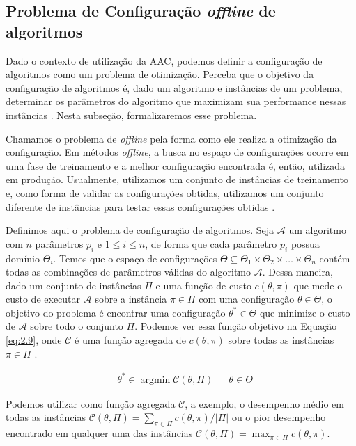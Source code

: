 \subsection{Problema de Configuração \textit{offline} de algoritmos}

Dado o contexto de utilização da \ac{AAC}, podemos definir a configuração de algoritmos como um problema de otimização. Perceba que o objetivo da configuração de algoritmos é, dado um algoritmo e instâncias de um problema, determinar os parâmetros do algoritmo que maximizam sua performance nessas instâncias \citep{birattari2009tuning}. Nesta subseção, formalizaremos esse problema.

Chamamos o problema de \textit{offline} pela forma como ele realiza a otimização da configuração. Em métodos \textit{offline}, a busca no espaço de configurações ocorre em uma fase de treinamento e a melhor configuração encontrada é, então, utilizada em produção. Usualmente, utilizamos um conjunto de instâncias de treinamento e, como forma de validar as configurações obtidas, utilizamos um conjunto diferente de instâncias para testar essas configurações obtidas \citep{birattari2009tuning}.

Definimos aqui o problema de configuração de algoritmos. Seja $\mathcal{A}$ um algoritmo com $n$ parâmetros $p_i$ e $1 \leq i \leq n$, de forma que cada parâmetro $p_i$ possua domínio $\Theta_i$. Temos que o espaço de configurações $\Theta \subseteq \Theta_1 \times \Theta_2 \times \ldots \times \Theta_n$ contém todas as combinações de parâmetros válidas do algoritmo $\mathcal{A}$. Dessa maneira, dado um conjunto de instâncias $\Pi$ e uma função de custo $c(\theta, \pi)$ que mede o custo de executar $\mathcal{A}$ sobre a instância $\pi \in \Pi$ com uma configuração $\theta \in \Theta$, o objetivo do problema é encontrar uma configuração $\theta^* \in \Theta$ que minimize o custo de $\mathcal{A}$ sobre todo o conjunto $\Pi$. Podemos ver essa função objetivo na Equação \ref{eq:2.9}, onde $\mathcal{C}$ é uma função agregada de $c(\theta, \pi)$ sobre todas as instâncias $\pi \in \Pi$ \citep{souza2022automatic}.

\begin{align} \label{eq:2.9}
&\theta^* \in \operatorname{argmin}\mathcal{C}(\theta, \Pi) &&\theta \in \Theta
\end{align}

Podemos utilizar como função agregada $\mathcal{C}$, a exemplo, o desempenho médio em todas as instâncias $\mathcal{C}(\theta, \Pi) = \sum_{\pi \in \Pi} c(\theta, \pi) / |\Pi|$ ou o pior desempenho encontrado em qualquer uma das instâncias $\mathcal{C}(\theta, \Pi) = \max_{\pi \in \Pi} c(\theta, \pi)$.

